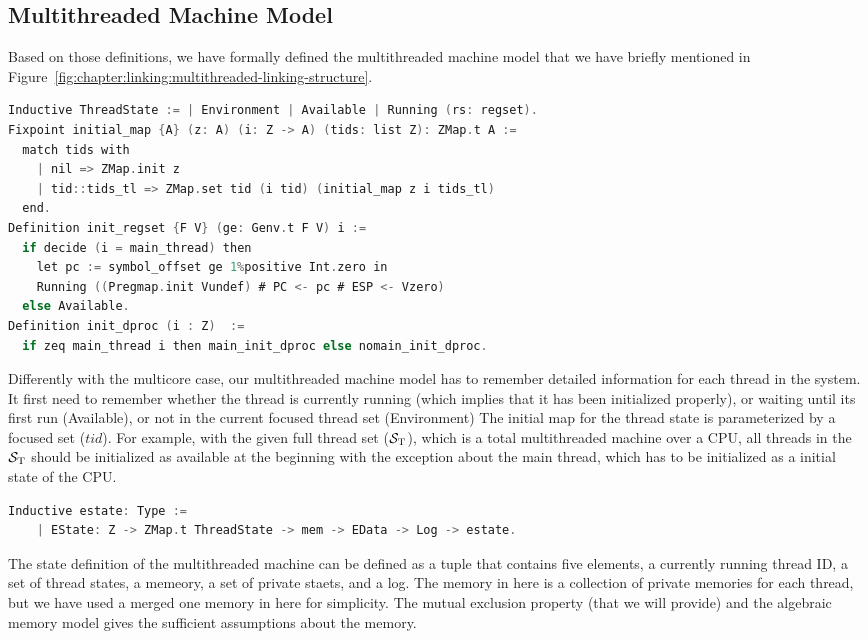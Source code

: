 \subsection{Multithreaded Machine Model}
\label{chapter:linking:subsec:multithreaded-machine-model}

Based on those definitions, we have formally defined 
the multithreaded machine model that we have briefly 
mentioned in Figure~\ref{fig:chapter:linking:multithreaded-linking-structure}.
\begin{lstlisting}[language=C]
Inductive ThreadState := | Environment | Available | Running (rs: regset).
Fixpoint initial_map {A} (z: A) (i: Z -> A) (tids: list Z): ZMap.t A :=
  match tids with
    | nil => ZMap.init z
    | tid::tids_tl => ZMap.set tid (i tid) (initial_map z i tids_tl)
  end.
Definition init_regset {F V} (ge: Genv.t F V) i :=
  if decide (i = main_thread) then
    let pc := symbol_offset ge 1%positive Int.zero in
    Running ((Pregmap.init Vundef) # PC <- pc # ESP <- Vzero)
  else Available.
Definition init_dproc (i : Z)  :=
  if zeq main_thread i then main_init_dproc else nomain_init_dproc.
\end{lstlisting}
Differently with the multicore case, 
our multithreaded machine model has to remember detailed information 
for each thread in the system. 
It first need to remember whether the thread is currently running (which implies that it has been initialized properly),
or waiting until its first run (Available), or not in the current focused thread set (Environment)
The initial map for the thread state is parameterized by a focused set ($tid$). 
For example, with the given full thread set (${\mathcal{S}_{\mathrm{T}}}$), which is a total multithreaded machine over a CPU, 
all threads in the ${\mathcal{S}_{\mathrm{T}}}$ should be initialized as available at the beginning with the exception about the main thread, 
which has to be initialized as a initial state of the CPU.  

\begin{lstlisting}[language=C]
  Inductive estate: Type :=
    | EState: Z -> ZMap.t ThreadState -> mem -> EData -> Log -> estate.
\end{lstlisting}

The state definition of the multithreaded machine can be defined as  a tuple that contains five elements,
a currently running thread ID, a set of thread states, a memeory, a set of private staets, and a log. 
The memory in here is a collection of private memories for each thread, 
but we have used a merged one memory in here for simplicity.
The mutual exclusion property (that we will provide) and 
the algebraic memory model gives the sufficient assumptions about the memory.  

